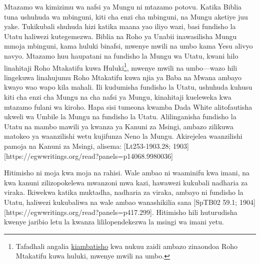 Mtazamo wa kimizimu wa nafsi ya Mungu ni mtazamo potovu. Katika Biblia tuna ushuhuda wa mbinguni, kiti cha enzi cha mbinguni, na Mungu aketiye juu yake. Tukikubali shuhuda hizi katika maana yao iliyo wazi, basi fundisho la Utatu haliwezi kutegemezwa. Biblia na Roho ya Unabii inawasilisha Mungu mmoja mbinguni, kama huluki binafsi, mwenye mwili na umbo kama Yesu alivyo navyo. Mtazamo huu haupatani na fundisho la Mungu wa Utatu, kwani hilo linahitaji Roho Mtakatifu kuwa Huluki\footnote{Tafadhali angalia \hyperref[appendix:unauthenticated-reports]{kiambatisho} kwa nukuu zaidi ambazo zinaondoa Roho Mtakatifu kuwa huluki, mwenye mwili na umbo.}, mwenye mwili na umbo—wazo hili lingekuwa linahujumu Roho Mtakatifu kuwa njia ya Baba na Mwana ambayo kwayo wao wapo kila mahali. Ili kudumisha fundisho la Utatu, ushuhuda kuhusu kiti cha enzi cha Mungu na cha nafsi ya Mungu, kinahitaji kueleweka kwa mtazamo fulani wa kiroho. Hapa sisi tumeona kwamba Dada White alitofautisha ukweli wa Umbile la Mungu na fundisho la Utatu. Alilinganisha fundisho la Utatu na mambo mawili ya kwanza ya Kanuni za Msingi, ambazo zilikuwa matokeo ya waanzilishi wetu kujifunza Neno la Mungu. Akirejelea waanzilishi pamoja na Kanuni za Msingi, alisema: [Lt253-1903.28; 1903][https://egwwritings.org/read?panels=p14068.9980036]

Hitimisho ni moja kwa moja na rahisi. Wale ambao ni waaminifu kwa imani, na kwa kanuni zilizopokelewa mwanzoni mwa kazi, hawawezi kukubali nadharia za viraka. Ikiwekwa katika muktadha, nadharia za viraka, ambayo ni fundisho la Utatu, haliwezi kukubaliwa na wale ambao wanashikilia sana [SpTB02 59.1; 1904][https://egwwritings.org/read?panels=p417.299]. Hitimisho hili huturudisha kwenye jaribio letu la kwanza lililopendekezwa la msingi wa imani yetu.


